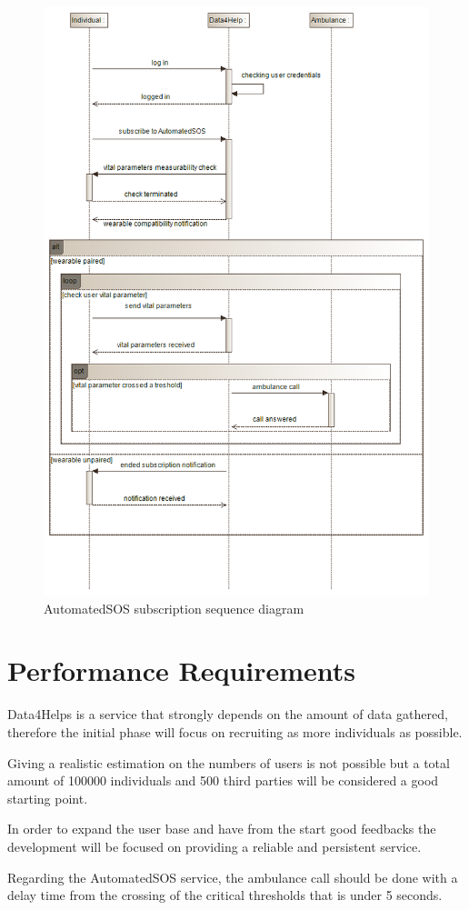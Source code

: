 \begin{figure}[H]
	\centering
  \includegraphics[width=0.70\linewidth]{resources/UML/AutomatedSOSsequence.png}
  \caption{AutomatedSOS subscription sequence diagram}
  \label{fig: AutomatedSOS sequence diagram}
\end{figure}



\section{Performance Requirements}
Data4Helps is a service that strongly depends on the amount of data gathered, therefore the initial phase will focus on recruiting as more individuals as possible.

Giving a realistic estimation on the numbers of users is not possible but a total amount of 100000 individuals and 500 third parties will be considered a good starting point.

In order to expand the user base and have from the start good feedbacks the development will be focused on providing a reliable and persistent service. 

Regarding the AutomatedSOS service, the ambulance call should be done with a delay time from the crossing of the critical thresholds that is under 5 seconds.

